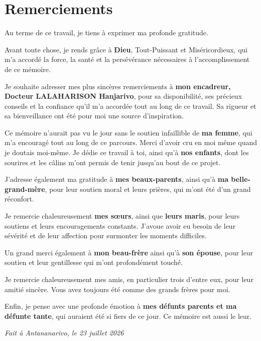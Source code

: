 
\chapter*{Remerciements}

Au terme de ce travail, je tiens à exprimer ma profonde gratitude.

Avant toute chose, je rends grâce à \textbf{Dieu}, Tout-Puissant et Miséricordieux, qui m'a accordé la force, la santé et la persévérance nécessaires à l'accomplissement de ce mémoire.

Je souhaite adresser mes plus sincères remerciements à \textbf{mon encadreur, Docteur LALAHARISON Hanjarivo}, pour sa disponibilité, ses précieux conseils et la confiance qu'il m'a accordée tout au long de ce travail. Sa rigueur et sa bienveillance ont été pour moi une source d'inspiration.

Ce mémoire n'aurait pas vu le jour sans le soutien infaillible de \textbf{ma femme}, qui m'a encouragé tout au long de ce parcours. Merci d'avoir cru en moi même quand je doutais moi-même. Je dédie ce travail à toi, ainsi qu'à \textbf{nos enfants}, dont les sourires et les câlins m'ont permis de tenir jusqu'au bout de ce projet.

J'adresse également ma gratitude à \textbf{mes beaux-parents}, ainsi qu'à \textbf{ma belle-grand-mère}, pour leur soutien moral et leurs prières, qui m'ont été d'un grand réconfort.

Je remercie chaleureusement \textbf{mes sœurs}, ainsi que \textbf{leurs maris}, pour leurs soutiens et leurs encouragements constants. J'avoue avoir eu besoin de leur sévérité et de leur affection pour surmonter les moments difficiles.

Un grand merci également à \textbf{mon beau-frère} ainsi qu'à \textbf{son épouse}, pour leur soutien et leur gentillesse qui m'ont profondément touché.

Je remercie chaleureusement mes amis, en particulier trois d'entre eux, pour leur amitié sincère. Vous avez toujours été comme des grands frères pour moi.

Enfin, je pense avec une profonde émotion à \textbf{mes défunts parents et ma défunte tante}, qui auraient été si fiers de ce jour. Ce mémoire est aussi le leur.

\vspace{1cm}
\begin{flushright}
\textit{Fait à Antananarivo, le 23 juillet 2026}
\end{flushright}